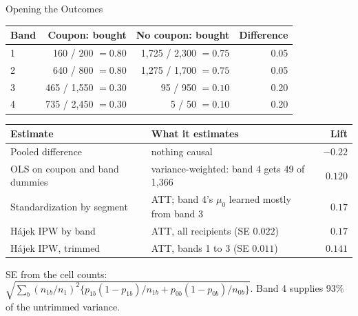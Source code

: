 \documentclass[aspectratio=169, 11pt, handout]{beamer}
\begin{document}
\begin{frame}{Opening the Outcomes}

\begin{center}
\small
\begin{tabular}{lrrr}
\toprule
\textbf{Band} & \textbf{Coupon: bought} & \textbf{No coupon: bought} & \textbf{Difference} \\
\midrule
1 & 160 / 200 $= 0.80$ & 1{,}725 / 2{,}300 $= 0.75$ & 0.05 \\
2 & 640 / 800 $= 0.80$ & 1{,}275 / 1{,}700 $= 0.75$ & 0.05 \\
3 & 465 / 1{,}550 $= 0.30$ & 95 / 950 $= 0.10$ & 0.20 \\
4 & 735 / 2{,}450 $= 0.30$ & 5 / 50 $= 0.10$ & 0.20 \\
\bottomrule
\end{tabular}
\end{center}

\begin{center}
\small
\begin{tabular}{llr}
\toprule
\textbf{Estimate} & \textbf{What it estimates} & \textbf{Lift} \\
\midrule
Pooled difference & nothing causal & $-0.22$ \\
OLS on coupon and band dummies & variance-weighted: band 4 gets 49 of 1{,}366 & $0.120$ \\
Standardization by segment & ATT; band 4's $\mu_0$ learned mostly from band 3 & $0.17$ \\
H\'ajek IPW by band & ATT, all recipients (SE $0.022$) & $0.17$ \\
H\'ajek IPW, trimmed & ATT, bands 1 to 3 (SE $0.011$) & $0.141$ \\
\bottomrule
\end{tabular}
\end{center}

\small SE from the cell counts: $\sqrt{\sum_b (n_{1b}/n_1)^2\{p_{1b}(1-p_{1b})/n_{1b} + p_{0b}(1-p_{0b})/n_{0b}\}}$. Band 4 supplies 93\% of the untrimmed variance.
\end{frame}
\end{document}
